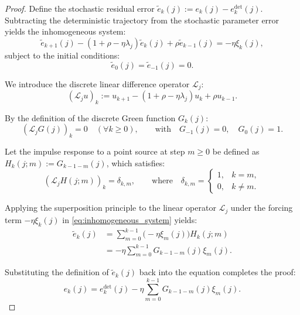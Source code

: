 \begin{proof}

Define the stochastic residual error $\tilde{e}_k(j) := e_k(j) - e_k^{\mathrm{det}}(j)$. Subtracting the deterministic trajectory from the stochastic parameter error yields the inhomogeneous system:
\begin{equation} \label{eq:inhomogeneous_system}
    \tilde{e}_{k+1}(j) - (1+\rho-\eta\lambda_j)\tilde{e}_k(j) + \rho\tilde{e}_{k-1}(j) = -\eta\xi_k(j),
\end{equation}
subject to the initial conditions:
\begin{equation*} \label{eq:zero_initial_conditions}
    \tilde{e}_0(j) = \tilde{e}_{-1}(j) = 0.
\end{equation*}

We introduce the discrete linear difference operator $\mathcal{L}_j$:
\begin{equation*}
    (\mathcal{L}_j u)_k := u_{k+1} - (1+\rho-\eta\lambda_j)u_k + \rho u_{k-1}.
\end{equation*}

By the definition of the discrete Green function $G_k(j)$:
\begin{equation*}
    (\mathcal{L}_j G(j))_k = 0 \quad (\forall k \ge 0), \qquad \text{with} \quad G_{-1}(j) = 0, \quad G_0(j) = 1.
\end{equation*}

Let the impulse response to a point source at step $m \ge 0$ be defined as $H_k(j; m) := G_{k-1-m}(j)$, which satisfies:
\begin{equation*}
    (\mathcal{L}_j H(j; m))_k = \delta_{k, m}, \qquad \text{where} \quad \delta_{k,m} = \begin{cases} 1, & k = m, \\ 0, & k \neq m. \end{cases}
\end{equation*}

Applying the superposition principle to the linear operator $\mathcal{L}_j$ under the forcing term $-\eta\xi_k(j)$ in \eqref{eq:inhomogeneous_system} yields:
\begin{align*}
    \tilde{e}_k(j) &= \sum_{m=0}^{k-1} \big(-\eta\xi_m(j)\big) H_k(j; m) \nonumber \\
    &= -\eta \sum_{m=0}^{k-1} G_{k-1-m}(j)\xi_m(j).
\end{align*}

Substituting the definition of $\tilde{e}_k(j)$ back into the equation completes the proof:
\begin{equation*}
    e_k(j) = e_k^{\mathrm{det}}(j) - \eta \sum_{m=0}^{k-1} G_{k-1-m}(j)\xi_m(j).
\end{equation*}
\end{proof}


